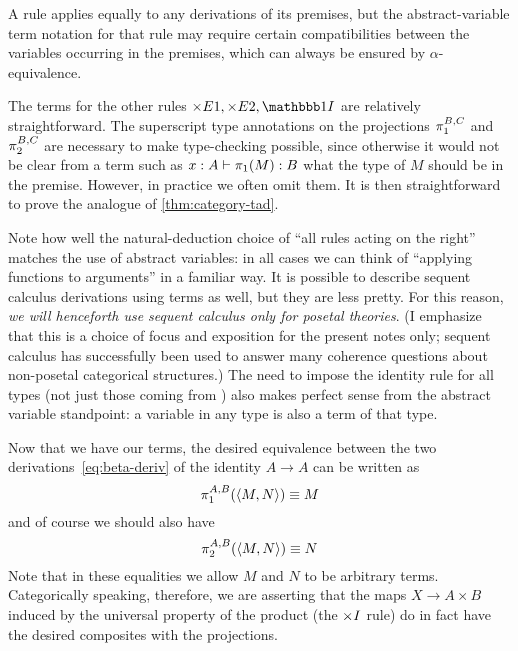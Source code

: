 \begin{princ}\label{princ:term-der-alpha}
  A rule applies equally to any derivations of its premises, but the abstract-variable term notation for that rule may require certain compatibilities between the variables occurring in the premises, which can always be ensured by $\alpha$-equivalence.
\end{princ}

The terms for the other rules $\timesE1,\timesE2,\unit I$ are relatively straightforward.
The superscript type annotations on the projections $\pi_{1}^{B,C}$ and $\pi_{2}^{B,C}$ are necessary to make type-checking possible, since otherwise it would not be clear from a term such as $x:A \vdash \pi_1(M):B$ what the type of $M$ should be in the premise.
However, in practice we often omit them.
It is then straightforward to prove the analogue of \cref{thm:category-tad}.

Note how well the natural-deduction choice of ``all rules acting on the right'' matches the use of abstract variables: in all cases we can think of ``applying functions to arguments'' in a familiar way.
It is possible to describe sequent calculus derivations using terms as well, but they are less pretty.
For this reason, \emph{we will henceforth use sequent calculus only for posetal theories}.
(I emphasize that this is a choice of focus and exposition for the present notes only; sequent calculus has successfully been used to answer many coherence questions about non-posetal categorical structures.)
The need to impose the identity rule for all types (not just those coming from \cG) also makes perfect sense from the abstract variable standpoint: a variable in any type is also a term of that type.

Now that we have our terms, the desired equivalence between the two derivations~\eqref{eq:beta-deriv} of the identity $A\to A$ can be written as
\begin{equation}
  \pr1AB(\pair M N) \equiv M\label{eq:beta-prodcat-1}
\end{equation}
and of course we should also have
\begin{equation}
  \pr2AB(\pair M N) \equiv N\label{eq:beta-prodcat-2}
\end{equation}
Note that in these equalities we allow $M$ and $N$ to be arbitrary terms.
Categorically speaking, therefore, we are asserting that the maps $X\to A\times B$ induced by the universal property of the product (the $\timesI$ rule) do in fact have the desired composites with the projections.

